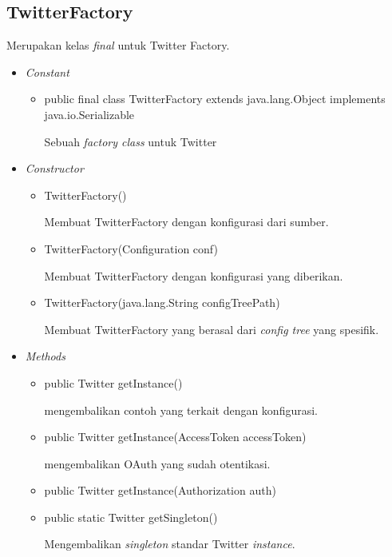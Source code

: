 \subsection{TwitterFactory}
	Merupakan kelas \textit{final} untuk Twitter Factory.
	\begin{itemize}
		\item \textit{Constant}
		
		\begin{itemize}
			\item public final class TwitterFactory
			extends java.lang.Object
			implements java.io.Serializable
			
			Sebuah \textit{factory class} untuk Twitter
		\end{itemize}
		\item \textit{Constructor}
		
		\begin{itemize}
			\item TwitterFactory()
			
			Membuat TwitterFactory dengan konfigurasi dari sumber.
			\item TwitterFactory(Configuration conf)
			
			Membuat TwitterFactory dengan konfigurasi yang diberikan.
			\item TwitterFactory(java.lang.String configTreePath)
			
			Membuat TwitterFactory yang berasal dari \textit{config tree} yang spesifik.
		\end{itemize}
		\item \textit{Methods}
		
		\begin{itemize}
			\item public Twitter getInstance()
			
			mengembalikan contoh yang terkait dengan konfigurasi.
			\item public Twitter getInstance(AccessToken accessToken)
			
			mengembalikan OAuth yang sudah otentikasi.
			\item public Twitter getInstance(Authorization auth)
			\item public static Twitter getSingleton()
			
			Mengembalikan \textit{singleton} standar Twitter \textit{instance}.
		\end{itemize}
	\end{itemize}
	
	
